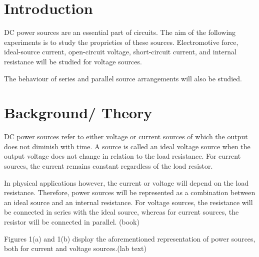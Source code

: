 \documentclass[a4paper]{article}
\begin{document}
\section{Introduction}
DC power sources are an essential part of circuits. The aim of the following
experiments is to study the proprieties of these sources. Electromotive force,
ideal-source current, open-circuit voltage, short-circuit current, and internal
resistance will be studied for voltage sources.

The behaviour of series and parallel source arrangements will also be studied.

\section{Background/ Theory}
DC power sources refer to either voltage or current sources of which the output
does not diminish with time. A source is called an ideal voltage source when the
output voltage does not change in relation to the load resistance. For current
sources, the current remains constant regardless of the load resistor. 

In physical applications however, the current or voltage will depend on the load
resistance. Therefore, power sources will be represented as a combination
between an ideal source and an internal resistance. For voltage sources, the
resistance will be connected in series with the ideal source, whereas for
current sources, the resistor will be connected in parallel. (book)

Figures 1(a) and 1(b) display the aforementioned representation of power
sources, both for current and voltage sources.(lab text)
\end{document}
